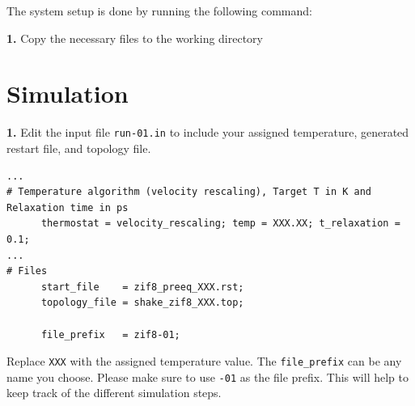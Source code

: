 \documentclass[
  letterpaper,
  DIV=11,
  numbers=noendperiod]{scrreprt}
\newenvironment{Shaded}{\begin{snugshade}}{\end{snugshade}}
\newcommand{\FunctionTok}[1]{\textcolor[rgb]{0.28,0.35,0.67}{#1}}
\newcommand{\NormalTok}[1]{\textcolor[rgb]{0.00,0.23,0.31}{#1}}
\newcommand{\OperatorTok}[1]{\textcolor[rgb]{0.37,0.37,0.37}{#1}}
\newcommand{\PreprocessorTok}[1]{\textcolor[rgb]{0.68,0.00,0.00}{#1}}
\newcommand{\VariableTok}[1]{\textcolor[rgb]{0.07,0.07,0.07}{#1}}
\begin{document}

The system setup is done by running the following command:

\textbf{1.} Copy the necessary files to the working directory

\begin{Shaded}
\end{Shaded}

\hypertarget{simulation-1}{%
\section*{Simulation}\label{simulation-1}}


\textbf{1.} Edit the input file \texttt{run-01.in} to include your
assigned temperature, generated restart file, and topology file.

\begin{verbatim}
...
# Temperature algorithm (velocity rescaling), Target T in K and Relaxation time in ps
      thermostat = velocity_rescaling; temp = XXX.XX; t_relaxation = 0.1;
...
# Files
      start_file    = zif8_preeq_XXX.rst;
      topology_file = shake_zif8_XXX.top;

      file_prefix   = zif8-01;
\end{verbatim}

\begin{tcolorbox}[enhanced jigsaw, title=\textcolor{quarto-callout-note-color}{\faInfo}\hspace{0.5em}{Note}, colbacktitle=quarto-callout-note-color!10!white, bottomtitle=1mm, breakable, colframe=quarto-callout-note-color-frame, toprule=.15mm, opacitybacktitle=0.6, bottomrule=.15mm, titlerule=0mm, arc=.35mm, rightrule=.15mm, toptitle=1mm, coltitle=black, left=2mm, opacityback=0, colback=white, leftrule=.75mm]

Replace \texttt{XXX} with the assigned temperature value. The
\texttt{file\_prefix} can be any name you choose. Please make sure to
use \texttt{-01} as the file prefix. This will help to keep track of the
different simulation steps.

\end{tcolorbox}
\end{document}

